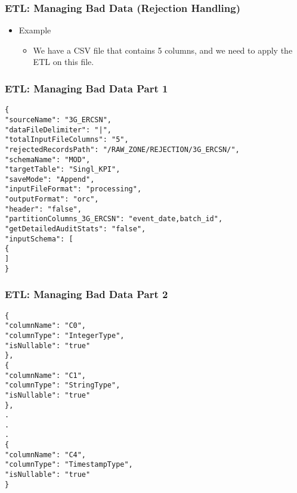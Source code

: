 \begin{frame}[fragile]
	\frametitle{ETL: Managing Bad Data (Rejection Handling)}

	\begin{itemize}
		\item Example
		\begin{itemize}
			\item  We have a CSV file that contains 5 columns, and we need to apply the ETL on this file.
		\end{itemize}
	\end{itemize}



\end{frame}
\begin{frame}[fragile]
	\frametitle{ETL: Managing Bad Data Part 1}

\begin{lstlisting}[style=json]
{
"sourceName": "3G_ERCSN",
"dataFileDelimiter": "|",
"totalInputFileColumns": "5",
"rejectedRecordsPath": "/RAW_ZONE/REJECTION/3G_ERCSN/",
"schemaName": "MOD",
"targetTable": "Singl_KPI",
"saveMode": "Append",
"inputFileFormat": "processing",
"outputFormat": "orc",
"header": "false",
"partitionColumns_3G_ERCSN": "event_date,batch_id",
"getDetailedAuditStats": "false",
"inputSchema": [
{
]
}
\end{lstlisting}

\end{frame}
\begin{frame}[fragile]
	\frametitle{ETL: Managing Bad Data Part 2}

\begin{lstlisting}[style=json,basicstyle=\scriptsize ]
{
"columnName": "C0",
"columnType": "IntegerType",
"isNullable": "true"
},
{
"columnName": "C1",
"columnType": "StringType",
"isNullable": "true"
},
.
.
.
{
"columnName": "C4",
"columnType": "TimestampType",
"isNullable": "true"
}
\end{lstlisting}

\end{frame}

